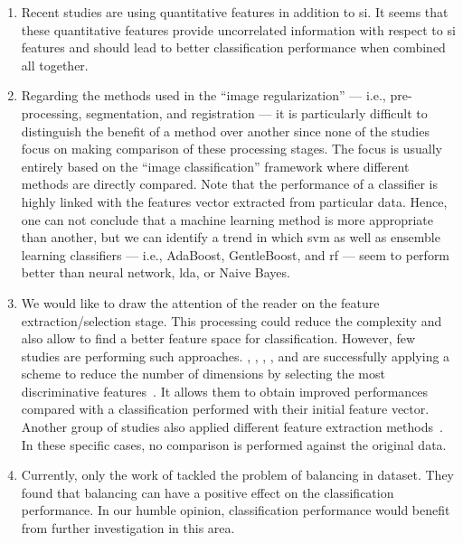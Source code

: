 \begin{enumerate}
\item Recent studies are using quantitative features in addition to \ac{si}.
  It seems that these quantitative features provide uncorrelated information with
  respect to \ac{si} features and should lead to better classification
  performance when combined all together.

\item Regarding the methods used in the ``image regularization'' --- i.e.,
  pre-processing, segmentation, and registration --- it is particularly
  difficult to distinguish the benefit of a method over another since none of
  the studies focus on making comparison of these processing stages.
  The focus is usually entirely based on the ``image classification'' framework
  where different methods are directly compared.
  Note that the performance of a classifier is highly linked with the features
  vector extracted from particular data.
  Hence, one can not conclude that a machine learning method is more appropriate
  than another, but we can identify a trend in which \ac{svm} as well as ensemble
  learning classifiers --- i.e., AdaBoost, GentleBoost, and \ac{rf} --- seem to
  perform better than neural network, \ac{lda}, or Naive Bayes.

\item We would like to draw the attention of the reader on the feature
  extraction/selection stage.
  This processing could reduce the complexity and also allow to find a better
  feature space for classification.
  However, few studies are performing such approaches.
  \citeauthor{Niaf2012}, \citeauthor{khalvati2015automated},
  \citeauthor{chung2015prostate}, \citeauthor{rampun2016computer}, and \citeauthor{Lemaitre2016thesis} are
  successfully applying a scheme to reduce the number of dimensions by selecting
  the most discriminative
  features~\cite{Niaf2011,Niaf2012,khalvati2015automated,chung2015prostate,rampun2016computer,rampun2015computer,Lemaitre2016thesis}.
  It allows them to obtain improved performances compared with a classification
  performed with their initial feature vector.
  Another group of studies also applied different feature extraction
  methods~\cite{Viswanath2008a,Viswanath2008,Viswanath2012,Tiwari2007,Tiwari2008,Tiwari2009,Tiwari2010,Tiwari2012,Tiwari2013,lehaire2014computer,rampun2016computerb,rampun2015classifying,Lemaitre2016thesis}.
  In these specific cases, no comparison is performed against the original
  data.

\item Currently, only the work of \citeauthor{Lemaitre2016thesis} tackled the
  problem of balancing in dataset.
  They found that balancing can have a positive effect on the classification
  performance.
  In our humble opinion, classification performance would benefit from further
  investigation in this area.
\end{enumerate}

